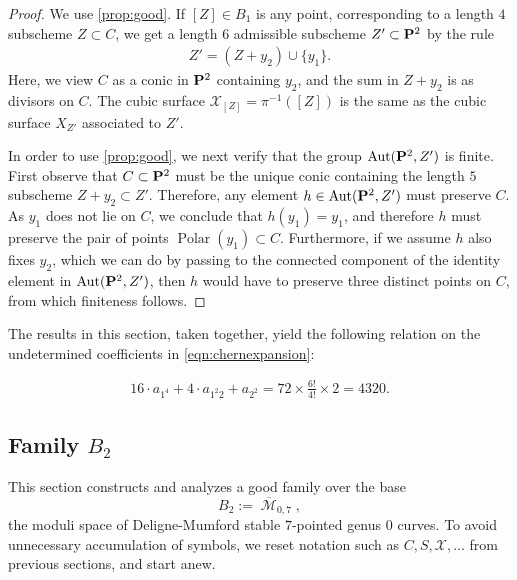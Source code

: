 \documentclass[12pt,reqno]{amsart}
\DeclareMathOperator{\Polar}{Polar}
\DeclareMathOperator{\M}{\mathcal{M}}
\numberwithin{equation}{section}
\newcommand{\cX}{\mathcal{X}}
\begin{document}
\begin{proof}
  We use \autoref{prop:good}. If $[Z] \in B_{1}$ is any point,
   corresponding to a length $4$ subscheme $Z \subset C$, we get a
  length $6$ admissible subscheme $Z' \subset \P^2$ by the rule
  \begin{align*}
    Z' = (Z+y_2) \cup \{y_{1}\}.
  \end{align*}
  Here, we view $C$ as a conic in $\P^{2}$ containing $y_{2}$, and the
  sum in $Z + y_{2}$ is as divisors on $C$.  The cubic surface
  $\cX_{[Z]} = \pi^{-1}([Z])$ is the same as the cubic surface $X_{Z'}$
  associated to $Z'$.

  In order to use \autoref{prop:good}, we next verify that the group
  $\Aut(\P^{2},Z')$ is finite.  First observe that $C \subset \P^{2}$
  must be the unique conic containing the length $5$ subscheme
  $ Z + y_{2} \subset Z'$.  Therefore, any element
  $h \in \Aut(\P^{2},Z')$ must preserve $C$.  As $y_{1}$ does not lie
  on $C$, we conclude that $h(y_{1}) = y_{1}$, and therefore $h$ must
  preserve the pair of points $\Polar(y_{1}) \subset C$. Furthermore,
  if we assume $h$ also fixes $y_{2}$, which we can do by passing to
  the connected component of the identity element in
  $\Aut(\P^{2},Z')$, then $h$ would have to preserve three distinct
  points on $C$, from which finiteness follows.
\end{proof}


The results in this section, taken together, yield the following
relation on the undetermined coefficients in
\eqref{eqn:chernexpansion}:

\begin{align}
  \label{eq:relation1}
  16 \cdot a_{1^4} + 4 \cdot a_{1^2 2} + a_{2^2} = 72 \times \frac{6!}{4!} \times 2 = 4320.
\end{align}


\subsection{Family $B_2$}
\label{sec:family-b_2}


This section constructs and analyzes a good family over the base
$$B_2 := \overline{\M}_{0,7},$$
the moduli space of Deligne-Mumford stable $7$-pointed genus $0$
curves.  To avoid unnecessary accumulation of symbols, we reset
notation such as $C,S,\cX, \dots$ from previous sections, and start
anew.
\end{document}
